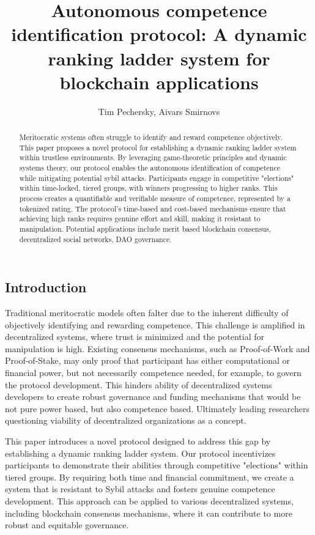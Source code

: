 \documentclass{article}
\title{Autonomous competence identification protocol: A dynamic ranking ladder system for blockchain applications}
\author{Tim Pechersky, Aivars Smirnovs}
\begin{document}
\begin{CJK}{UTF8}{gbsn}

    \maketitle


    \begin{abstract}
        Meritocratic systems often struggle to identify and reward competence objectively. This paper proposes a novel protocol for establishing a dynamic ranking ladder system within trustless environments. By leveraging game-theoretic principles and dynamic systems theory, our protocol enables the autonomous identification of competence while mitigating potential sybil attacks. Participants engage in competitive "elections" within time-locked, tiered groups, with winners progressing to higher ranks. This process creates a quantifiable and verifiable measure of competence, represented by a tokenized rating. The protocol's time-based and cost-based mechanisms ensure that achieving high ranks requires genuine effort and skill, making it resistant to manipulation.  Potential applications include merit based blockchain consensus, decentralized social networks, DAO governance.
    \end{abstract}

    \section{Introduction}

    Traditional meritocratic models often falter due to the inherent difficulty of objectively identifying and rewarding competence.\cite{Arrow2000} This challenge is amplified in decentralized systems, where trust is minimized and the potential for manipulation is high. Existing consensus mechanisms, such as Proof-of-Work and Proof-of-Stake, may only proof that participant has either computational or financial power, but not necessarily competence needed, for example, to govern the protocol development. This hinders ability of decentralized systems developers to create robust governance and funding mechanisms that would be not pure power based, but also competence based.\cite{Rainer2023}\cite{Robin22} Ultimately leading researchers questioning viability of decentralized organizations as a concept.\cite{Xuan2024}

    This paper introduces a novel protocol designed to address this gap by establishing a dynamic ranking ladder system. Our protocol incentivizes participants to demonstrate their abilities through competitive "elections" within tiered groups. By requiring both time and financial commitment, we create a system that is resistant to Sybil attacks and fosters genuine competence development. This approach can be applied to various decentralized systems, including blockchain consensus mechanisms, where it can contribute to more robust and equitable governance.


\end{CJK}
\end{document}
